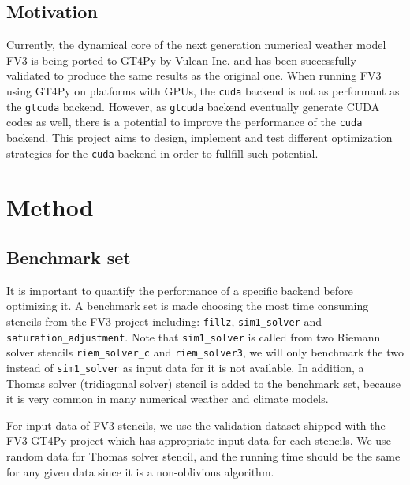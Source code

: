 \documentclass[]{article}
\begin{document}
\subsection{Motivation}

Currently, the dynamical core of the next generation numerical weather model FV3 is being ported to GT4Py by Vulcan Inc. and has been successfully validated to produce the same results as the original one. When running FV3 using GT4Py on platforms with GPUs, the \texttt{cuda} backend is not as performant as the \texttt{gtcuda} backend. However, as \texttt{gtcuda} backend eventually generate CUDA codes as well, there is a potential to improve the performance of the \texttt{cuda} backend. This project aims to design, implement and test different optimization strategies for the \texttt{cuda} backend in order to fullfill such potential.

\section{Method}

\subsection{Benchmark set}
It is important to quantify the performance of a specific backend before optimizing it. A benchmark set is made choosing the most time consuming stencils from the FV3 project including: \texttt{fillz}, \texttt{sim1\_solver} and \texttt{saturation\_adjustment}. Note that \texttt{sim1\_solver} is called from two Riemann solver stencils \texttt{riem\_solver\_c} and \texttt{riem\_solver3}, we will only benchmark the two instead of \texttt{sim1\_solver} as input data for it is not available. In addition, a Thomas solver (tridiagonal solver) stencil is added to the benchmark set, because it is very common in many numerical weather and climate models.

For input data of FV3 stencils, we use the validation dataset shipped with the FV3-GT4Py project which has appropriate input data for each stencils. We use random data for Thomas solver stencil, and the running time should be the same for any given data since it is a non-oblivious algorithm.
\end{document}
